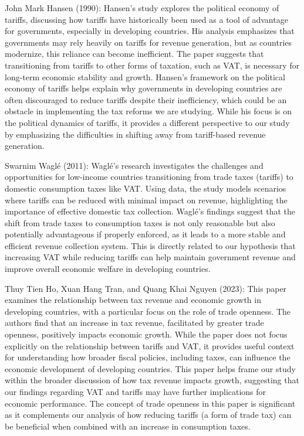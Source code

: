 \documentclass[12pt]{article}
\begin{document}
John Mark Hansen (1990):
Hansen's study explores the political economy of tariffs, discussing how tariffs have historically been used as a tool of advantage for governments, especially in developing countries. His analysis emphasizes that governments may rely heavily on tariffs for revenue generation, but as countries modernize, this reliance can become inefficient. The paper suggests that transitioning from tariffs to other forms of taxation, such as VAT, is necessary for long-term economic stability and growth. Hansen’s framework on the political economy of tariffs helps explain why governments in developing countries are often discouraged to reduce tariffs despite their inefficiency, which could be an obstacle in implementing the tax reforms we are studying. While his focus is on the political dynamics of tariffs, it provides a different perspective to our study by emphasizing the difficulties in shifting away from tariff-based revenue generation.

Swarnim Waglé (2011):
Waglé's research investigates the challenges and opportunities for low-income countries transitioning from trade taxes (tariffs) to domestic consumption taxes like VAT. Using data, the study models scenarios where tariffs can be reduced with minimal impact on revenue, highlighting the importance of effective domestic tax collection. Waglé’s findings suggest that the shift from trade taxes to consumption taxes is not only reasonable but also potentially advantageous if properly enforced, as it leads to a more stable and efficient revenue collection system. This is directly related to our hypothesis that increasing VAT while reducing tariffs can help maintain government revenue and improve overall economic welfare in developing countries.

Thuy Tien Ho, Xuan Hang Tran, and Quang Khai Nguyen (2023):
This paper examines the relationship between tax revenue and economic growth in developing countries, with a particular focus on the role of trade openness. The authors find that an increase in tax revenue, facilitated by greater trade openness, positively impacts economic growth. While the paper does not focus explicitly on the relationship between tariffs and VAT, it provides useful context for understanding how broader fiscal policies, including taxes, can influence the economic development of developing countries. This paper helps frame our study within the broader discussion of how tax revenue impacts growth, suggesting that our findings regarding VAT and tariffs may have further implications for economic performance. The concept of trade openness in this paper is significant as it complements our analysis of how reducing tariffs (a form of trade tax) can be beneficial when combined with an increase in consumption taxes.
\end{document}
